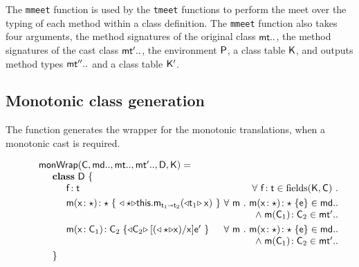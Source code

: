 \documentclass[sigconf]{acmart}
\begin{document}
The \texttt{mmeet} function is used by the \texttt{tmeet} functions to
perform the meet over the typing of each method within a class definition.
The \texttt{mmeet} function also takes four arguments, the method
signatures of the original class $\mt..$, the method signatures of the cast
class $\mtp..$, the environment $\P$, a class table $\K$, and outputs method
types $\mtpp..$ and a class table $\Kp$. \\

\begin{figure}
\hrulefill
\begin{mathpar}


\end{mathpar}
\end{figure}

\subsection{Monotonic class generation}\label{classgen}

The  function generates the wrapper for the monotonic translations,
when a monotonic cast is required.

\begin{figure}
\footnotesize
\[\begin{array}{l@{~}r@{}r@{~}r@{~}r@{~}rr}
\arrayrulecolor{white}
\classgen{\C, \md.., \mt.., \mtp.., \D, \K}= \\
\SP \class~\D~\{ \\
\SPP \Fdef\f\t & \All {{\f}\!:{\t} \in \text{fields}(\K,\C)}
\\[1mm]\hline
\SPP \Mdef\m\x\any\any {~\MonCast\any{\KCall\this\m{\MonCast{\t[1]}\x}{\t[1]}{\t[2]}}~}
&     \All \m \Mdef\m\x{\any}{\any}\e\in\md.. \\&\wedge\; \Mtype\m{\C_1}{\C_2}\in{\mtp..}
\\[1mm]\hline
\SPP \Mdef\m\x{\C_1}{\C_2} {\MonCast{\C_2}{[{(\MonCast{\any}\x)}/\x]\ep}~}
&     \All \m \Mdef\m\x{\any}{\any}\e\in\md.. \\&\wedge\; \Mtype\m{\C_1}{\C_2}\in\mtp.. 
\\[1mm]\hline
\SP\}
\end{array}
\]
\normalsize
\end{figure}
\end{document}
